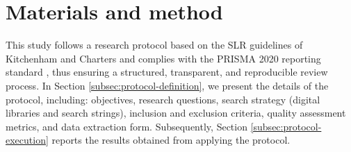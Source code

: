 \section{Materials and method}
\label{sec:methodology}

This study follows a research protocol based on the SLR guidelines of Kitchenham and Charters \cite{Kitchenham-Charters-guidelines} and complies with the PRISMA 2020 reporting standard \cite{PRISMA_2020_statement}, thus ensuring a structured, transparent, and reproducible review process. 
In Section \ref{subsec:protocol-definition}, we present the details of the protocol, including: objectives, research questions, search strategy (digital libraries and search strings), inclusion and exclusion criteria, quality assessment metrics, and data extraction form. Subsequently, Section \ref{subsec:protocol-execution} reports the results obtained from applying the protocol.

